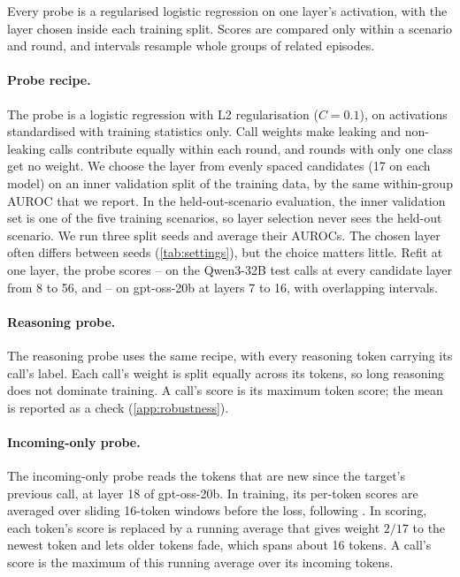 Every probe is a regularised logistic regression on one layer's activation, with the layer chosen inside each training split.
Scores are compared only within a scenario and round, and intervals resample whole groups of related episodes.

\paragraph{Probe recipe.}
The probe is a logistic regression with L2 regularisation ($C = 0.1$), on activations standardised with training statistics only.
Call weights make leaking and non-leaking calls contribute equally within each round, and rounds with only one class get no weight.
We choose the layer from evenly spaced candidates (17 on each model) on an inner validation split of the training data, by the same within-group AUROC that we report.
In the held-out-scenario evaluation, the inner validation set is one of the five training scenarios, so layer selection never sees the held-out scenario.
We run three split seeds and average their AUROCs.
The chosen layer often differs between seeds (\cref{tab:settings}), but the choice matters little.
Refit at one layer, the probe scores \eNineteenQwenLayerMidLow{}--\eNineteenQwenLayerMidHigh{} on the Qwen3-32B test calls at every candidate layer from 8 to 56, and \eNineteenGptLayerMidLow{}--\eNineteenGptLayerMidHigh{} on gpt-oss-20b at layers 7 to 16, with overlapping intervals.

\paragraph{Reasoning probe.}
The reasoning probe uses the same recipe, with every reasoning token carrying its call's label.
Each call's weight is split equally across its tokens, so long reasoning does not dominate training.
A call's score is its maximum token score; the mean is reported as a check (\cref{app:robustness}).

\paragraph{Incoming-only probe.}
The incoming-only probe reads the tokens that are new since the target's previous call, at layer 18 of gpt-oss-20b.
In training, its per-token scores are averaged over sliding 16-token windows before the loss, following \citet{cunningham2026}.
In scoring, each token's score is replaced by a running average that gives weight $2/17$ to the newest token and lets older tokens fade, which spans about 16 tokens.
A call's score is the maximum of this running average over its incoming tokens.

